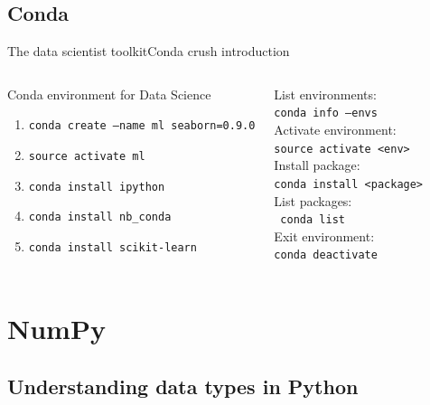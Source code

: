 \documentclass[10pt,compress]{beamer} %
\begin{document}
\subsection{Conda}
\begin{frame}{The data scientist toolkit}{Conda crush introduction}
    \begin{columns}
	   \begin{block}{Conda environment for Data Science}
	   	\begin{enumerate}
			\item \texttt{conda create --name ml seaborn=0.9.0}
			\item \texttt{source activate ml}
			\item \texttt{conda install ipython}
			\item \texttt{conda install nb\_conda}
			\item \texttt{conda install scikit-learn}
		\end{enumerate}
	   \end{block}

		List environments: \\ \quad \texttt{conda info --envs}\\
		Activate environment: \\ \quad \texttt{source activate <env>}\\
		Install package: \\ \quad \texttt{conda install <package>}\\
		List packages: \\ \quad \texttt{conda list}\\
		Exit environment: \\ \quad \indent \texttt{conda deactivate}
	\end{columns}
\end{frame}

\section{NumPy}

\subsection{Understanding data types in Python}
\end{document}
